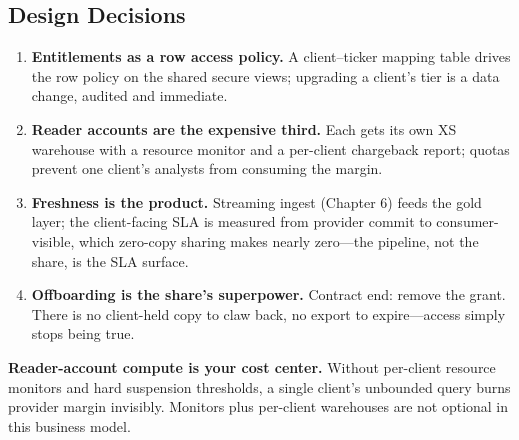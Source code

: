 \subsection{Design Decisions}
\begin{enumerate}
    \item \textbf{Entitlements as a row access policy.} A client--ticker mapping table drives the row policy on the shared secure views; upgrading a client's tier is a data change, audited and immediate.
    \item \textbf{Reader accounts are the expensive third.} Each gets its own XS warehouse with a resource monitor and a per-client chargeback report; quotas prevent one client's analysts from consuming the margin.
    \item \textbf{Freshness is the product.} Streaming ingest (Chapter 6) feeds the gold layer; the client-facing SLA is measured from provider commit to consumer-visible, which zero-copy sharing makes nearly zero---the pipeline, not the share, is the SLA surface.
    \item \textbf{Offboarding is the share's superpower.} Contract end: remove the grant. There is no client-held copy to claw back, no export to expire---access simply stops being true.
\end{enumerate}

\begin{pitfall}
\textbf{Reader-account compute is your cost center.} Without per-client resource monitors and hard suspension thresholds, a single client's unbounded query burns provider margin invisibly. Monitors plus per-client warehouses are not optional in this business model.
\end{pitfall}

